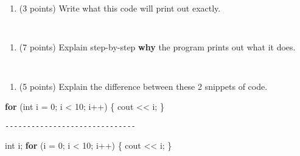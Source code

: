 \documentclass[
]{article}
\newenvironment{Shaded}{}{}
\newcommand{\ControlFlowTok}[1]{\textcolor[rgb]{0.00,0.44,0.13}{\textbf{#1}}}
\newcommand{\DataTypeTok}[1]{\textcolor[rgb]{0.56,0.13,0.00}{#1}}
\newcommand{\DecValTok}[1]{\textcolor[rgb]{0.25,0.63,0.44}{#1}}
\newcommand{\NormalTok}[1]{#1}
\providecommand{\tightlist}{%
  \setlength{\itemsep}{0pt}\setlength{\parskip}{0pt}}
\begin{document}
\begin{enumerate}
\def\labelenumi{\alph{enumi}.}
\tightlist
\item
  (3 points) Write what this code will print out exactly.
\end{enumerate}

\begin{verbatim}


\end{verbatim}

\begin{enumerate}
\def\labelenumi{\alph{enumi}.}
\setcounter{enumi}{1}
\tightlist
\item
  (7 points) Explain step-by-step \textbf{why} the program prints out
  what it does.
\end{enumerate}

\begin{verbatim}


\end{verbatim}

\pagebreak

\begin{enumerate}
\def\labelenumi{\arabic{enumi}.}
\setcounter{enumi}{3}
\tightlist
\item
  (5 points) Explain the difference between these 2 snippets of code.
\end{enumerate}

\begin{Shaded}
\begin{Highlighting}[]
\ControlFlowTok{for}\NormalTok{ (}\DataTypeTok{int}\NormalTok{ i = }\DecValTok{0}\NormalTok{; i \textless{} }\DecValTok{10}\NormalTok{; i++) \{}
\NormalTok{    cout \textless{}\textless{} i;}
\NormalTok{\}}
\end{Highlighting}
\end{Shaded}

\texttt{-\/-\/-\/-\/-\/-\/-\/-\/-\/-\/-\/-\/-\/-\/-\/-\/-\/-\/-\/-\/-\/-\/-\/-\/-\/-\/-\/-\/-\/-}

\begin{Shaded}
\begin{Highlighting}[]
\DataTypeTok{int}\NormalTok{ i;}
\ControlFlowTok{for}\NormalTok{ (i = }\DecValTok{0}\NormalTok{; i \textless{} }\DecValTok{10}\NormalTok{; i++) \{}
\NormalTok{    cout \textless{}\textless{} i;}
\NormalTok{\}}
\end{Highlighting}
\end{Shaded}

\begin{verbatim}








\end{verbatim}
\end{document}
